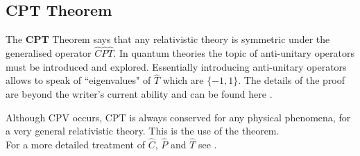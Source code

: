 \subsection{CPT Theorem}
The \textbf{CPT} Theorem says that any relativistic theory is symmetric under the generalised operator $\hat{C}\hat{P}\hat{T}$. In quantum theories the topic of anti-unitary operators must be introduced and explored. Essentially introducing anti-unitary operators allows to speak of ``eigenvalues" of $\hat{T}$ which are $\{-1,1\}$. The details of the proof are beyond the writer's current ability and can be found here \cite{CPT}.

Although CPV occurs, CPT is always conserved for any physical phenomena, for a very general relativistic theory. This is the use of the theorem.\\

For a more detailed treatment of $\hat{C}$, $\hat{P}$ and $\hat{T}$ see \cite{Martin+Shaw}.